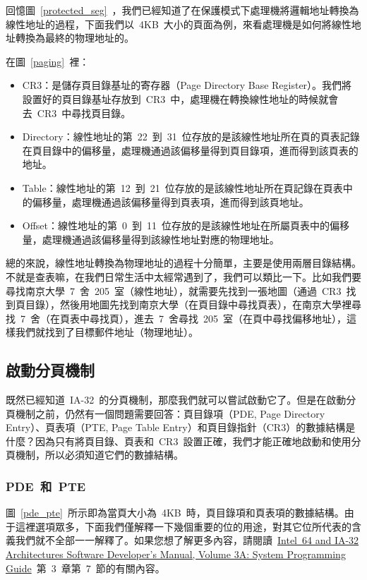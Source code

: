 回憶圖~\ref{protected_seg}~，我們已經知道了在保護模式下處理機將邏輯地址轉換為線性地址的過程，下面我們以~4KB~大小的頁面為例，來看處理機是如何將線性地址轉換為最終的物理地址的。


在圖~\ref{paging}~裡：
\begin{itemize}
\item CR3：是儲存頁目錄基址的寄存器（Page Directory Base Register）。我們將設置好的頁目錄基址存放到~CR3~中，處理機在轉換線性地址的時候就會去~CR3~中尋找頁目錄。
\item Directory：線性地址的第~22~到~31~位存放的是該線性地址所在頁的頁表記錄在頁目錄中的偏移量，處理機通過該偏移量得到頁目錄項，進而得到該頁表的地址。
\item Table：線性地址的第~12~到~21~位存放的是該線性地址所在頁記錄在頁表中的偏移量，處理機通過該偏移量得到頁表項，進而得到該頁地址。
\item Offset：線性地址的第~0~到~11~位存放的是該線性地址在所屬頁表中的偏移量，處理機通過該偏移量得到該線性地址對應的物理地址。
\end{itemize}

總的來說，線性地址轉換為物理地址的過程十分簡單，主要是使用兩層目錄結構。不就是查表嘛，在我們日常生活中太經常遇到了，我們可以類比一下。比如我們要尋找南京大學~7~舍~205~室（線性地址），就需要先找到一張地圖（通過~CR3~找到頁目錄），然後用地圖先找到南京大學（在頁目錄中尋找頁表），在南京大學裡尋找~7~舍（在頁表中尋找頁），進去~7~舍尋找~205~室（在頁中尋找偏移地址），這樣我們就找到了目標郵件地址（物理地址）。


\subsection{啟動分頁機制}

既然已經知道~IA-32~的分頁機制，那麼我們就可以嘗試啟動它了。但是在啟動分頁機制之前，仍然有一個問題需要回答：頁目錄項（PDE, Page Directory Entry）、頁表項（PTE, Page Table Entry）和頁目錄指針（CR3）的數據結構是什麼？因為只有將頁目錄、頁表和~CR3~設置正確，我們才能正確地啟動和使用分頁機制，所以必須知道它們的數據結構。

\subsubsection{PDE~和~PTE}

圖~\ref{pde_pte}~所示即為當頁大小為~4KB~時，頁目錄項和頁表項的數據結構。由于這裡選項眾多，下面我們僅解釋一下幾個重要的位的用途，對其它位所代表的含義我們就不全部一一解釋了。如果您想了解更多內容，請閱讀~\href{http://download.intel.com/design/processor/manuals/253668.pdf}{Intel\textregistered~64 and IA-32 Architectures Software Developer's Manual, Volume 3A: System Programming Guide}~第~3~章第~7~節的有關內容。

